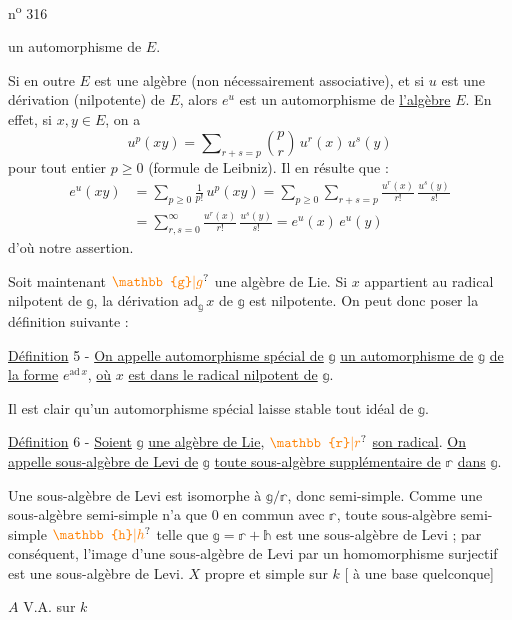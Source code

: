 \hfill n\textsuperscript{o} 316

un automorphisme de $E$.

Si en outre $E$ est une algèbre (non nécessairement associative), et si $u$ est une dérivation (nilpotente) de $E$, alors $e^u$ est un automorphisme de \uline{l'algèbre} $E$. En effet, si $x,y\in E$, on a
\[
u^p(xy)=\sum\nolimits_{r+s=p}\binom{p}{r}\,u^r(x)\,u^s(y)
\]
pour tout entier $p\geqslant 0$ (formule de Leibniz). Il en résulte que :
\[
\begin{aligned}
e^u(xy)&=\sum\nolimits_{p\geqslant 0}\frac{1}{p!}\,u^p(xy)
=\sum\nolimits_{p\geqslant 0}\sum\nolimits_{r+s=p}\frac{u^r(x)}{r!}\,\frac{u^s(y)}{s!}\\
&=\sum\nolimits_{r,s=0}^{\infty}\frac{u^r(x)}{r!}\,\frac{u^s(y)}{s!}
=e^u(x)\,e^u(y)
\end{aligned}
\]
d'où notre assertion.

Soit maintenant $\unsure{\mathbb{g}|g}$ une algèbre de Lie. Si $x$ appartient au radical nilpotent de $\mathbb{g}$, la dérivation $\mathrm{ad}_{\mathbb{g}}\,x$ de $\mathbb{g}$ est nilpotente. On peut donc poser la définition suivante :

\uline{Définition} 5 - \uline{On appelle automorphisme spécial de} $\mathbb{g}$ \uline{un automorphisme de} $\mathbb{g}$ \uline{de la forme} $e^{\mathrm{ad}\,x}$, \uline{où} $x$ \uline{est dans le radical nilpotent de} $\mathbb{g}$.

Il est clair qu'un automorphisme spécial laisse stable tout idéal de $\mathbb{g}$.

\uline{Définition} 6 - \uline{Soient} $\mathbb{g}$ \uline{une algèbre de Lie}, $\unsure{\mathbb{r}|r}$ \uline{son radical}. \uline{On appelle sous-algèbre de Levi de} $\mathbb{g}$ \uline{toute sous-algèbre supplémentaire de} $\mathbb{r}$ \uline{dans} $\mathbb{g}$.

Une sous-algèbre de Levi est isomorphe à $\mathbb{g}/\mathbb{r}$, donc semi-simple. Comme une sous-algèbre semi-simple n'a que $0$ en commun avec $\mathbb{r}$, toute sous-algèbre semi-simple $\unsure{\mathbb{h}|h}$ telle que $\mathbb{g}=\mathbb{r}+\mathbb{h}$ est une sous-algèbre de Levi ; par conséquent, l'image d'une sous-algèbre de Levi par un homomorphisme surjectif est une sous-algèbre de Levi.
$X$ propre et simple sur $k$ [ à une base quelconque]

$A$ V.A. sur $k$

